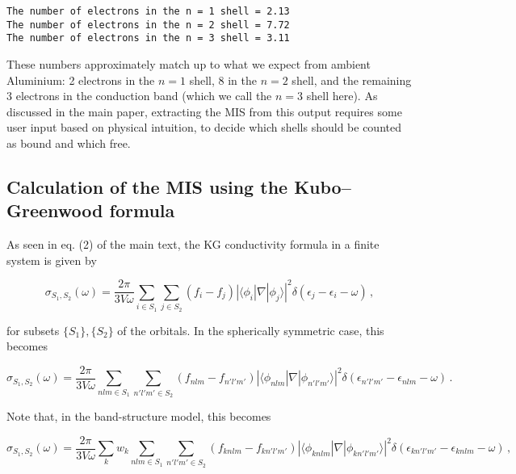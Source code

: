\documentclass[11pt]{article}
\begin{document}
    \begin{Verbatim}[commandchars=\\\{\}]
The number of electrons in the n = 1 shell = 2.13
The number of electrons in the n = 2 shell = 7.72
The number of electrons in the n = 3 shell = 3.11
    \end{Verbatim}

    These numbers approximately match up to what we expect from ambient
Aluminium: 2 electrons in the \(n=1\) shell, 8 in the \(n=2\) shell, and
the remaining 3 electrons in the conduction band (which we call the
\(n=3\) shell here). As discussed in the main paper, extracting the MIS
from this output requires some user input based on physical intuition,
to decide which shells should be counted as bound and which free.

    \hypertarget{calculation-of-the-mis-using-the-kubogreenwood-formula}{%
\subsection{Calculation of the MIS using the Kubo--Greenwood
formula}\label{calculation-of-the-mis-using-the-kubogreenwood-formula}}

As seen in eq. (2) of the main text, the KG conductivity formula in a
finite system is given by

\begin{equation}
\sigma_{S_1,S_2} (\omega)= \frac{2\pi}{3V\omega} \sum_{i\in S_1} \sum_{j\in S_2} (f_i - f_j) |\langle \phi_i | \nabla | \phi_j \rangle|^2 \delta (\epsilon_j - \epsilon_i - \omega)\,,
\end{equation}

for subsets \(\{S_1\},\{S_2\}\) of the orbitals. In the spherically
symmetric case, this becomes

\begin{equation}
\sigma_{S_1,S_2}(\omega) = \frac{2\pi}{3V\omega} \sum_{nlm\in S_1} \sum_{n'l'm'\in S_2} (f_{nlm} - f_{n'l'm'}) |\langle \phi_{nlm} | \nabla | \phi_{n'l'm'} \rangle|^2 \delta (\epsilon_{n'l'm'} - \epsilon_{nlm} - \omega)\,.
\end{equation}

Note that, in the band-structure model, this becomes

\begin{equation}
\sigma_{S_1,S_2} (\omega) = \frac{2\pi}{3V\omega} \sum_k w_k \sum_{nlm\in S_1} \sum_{n'l'm'\in S_2} (f_{knlm} - f_{kn'l'm'}) |\langle \phi_{knlm} | \nabla | \phi_{kn'l'm'} \rangle|^2 \delta (\epsilon_{kn'l'm'} - \epsilon_{knlm} - \omega)\,,
\end{equation}
\end{document}
